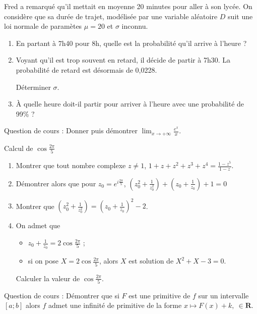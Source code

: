\begin{question}[topic=loi_continue]
Fred a remarqué qu'il mettait en moyenne 20 minutes pour aller à son
lycée. On considère que sa durée de trajet, modélisée par une variable
aléatoire $D$ suit une loi normale de paramètes $\mu = 20$ et $\sigma$
inconnu.

\begin{enumerate}
  \item En partant à 7h40 pour 8h, quelle est la probabilité qu'il
    arrive à l'heure ?
  \item Voyant qu'il est trop souvent en retard, il décide de partir à
    7h30. La probabilité de retard est désormais de 0,0228.

    Déterminer $\sigma$.
  \item À quelle heure doit-il partir pour arriver à l'heure avec une
    probabilité de 99\% ?
\end{enumerate}
\end{question}

\begin{question}[topic=exponentielle]
Question de cours : Donner puis démontrer
$\lim_{x\to+\infty}\frac{e^x}x$.
\end{question}

\begin{question}[topic=cos:complexes]
Calcul de $\cos\frac{2\pi}{5}$

\begin{enumerate}
  \item Montrer que tout nombre complexe $z\neq 1$, $1 + z + z^2 + z^3 +
    z^4 = \frac{1 - z^5}{1 - z}$.
  \item Démontrer alors que pour $z_0 = e^{i\frac{2\pi}5}$, $\left(z_0^2
    + \frac1{z_0^2} \right) + \left(z_0 + \frac1{z_0}\right) + 1 = 0$
  \item Montrer que $\left(z_0^2 + \frac1{z_0^2} \right) = \left(z_0 +
    \frac1{z_0}\right)^2 - 2$.
  \item On admet que
    \begin{itemize}
      \item $z_0 + \frac1{z_0} = 2\cos\frac{2\pi}5$ ;
      \item si on pose $X = 2\cos\frac{2\pi}5$, alors $X$ est solution
        de $X^2 + X - 3 = 0$.
    \end{itemize}
    Calculer la valeur de $\cos\frac{2\pi}5$.
\end{enumerate}
\end{question}

\begin{question}[topic=intégrale]
Question de cours : Démontrer que si $F$ est une primitive de $f$ sur un
intervalle $[a;b]$ alors $f$ admet une infinité de primitive de la forme
$x\mapsto F(x) + k,\ \in\mathbf{R}$.
\end{question}

